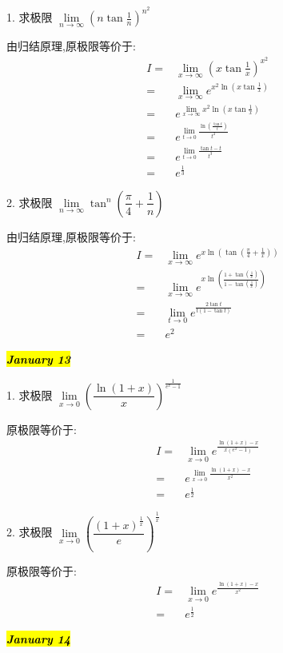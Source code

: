 1. 求极限 $\lim\limits_{n\to \infty}\left(n\tan\frac{1}{n}\right)^{n^{2}}$
\begin{solution}
	
	由归结原理,原极限等价于:
	\begin{align*}
		I = & \lim\limits_{x\to \infty}\left(x\tan\frac{1}{x}\right)^{x^{2}}\\
		  = & \lim\limits_{x\to \infty}e^{x^{2}\ln(x\tan\frac{1}{x})}\\
		  = & e^{\lim\limits_{x\to \infty}x^{2}\ln(x\tan\frac{1}{x})}\\
		  = & e^{\lim\limits_{t\to 0}\frac{\ln(\frac{\tan t}{t})}{t^{2}}}\\
		  = & e^{\lim\limits_{t\to 0}\frac{\tan t-t}{t^{3}}}\\
		  = & e^{\frac{1}{3}}
	\end{align*}
\end{solution}

2. 求极限 $\lim\limits_{n\to \infty}\tan^{n}\left( \dfrac{\pi}{4}+\dfrac{1}{n}\right)$
\begin{solution}
	
	由归结原理,原极限等价于:
	\begin{align*}
		I = & \lim\limits_{x\to \infty}e^{x\ln(\tan(\frac{\pi}{4}+\frac{1}{x}))}\\
		  = & \lim\limits_{x\to \infty}e^{x\ln(\frac{1+\tan(\frac{1}{x})}{1-\tan(\frac{1}{x})})}\\
		  = & \lim\limits_{t\to 0}e^{\frac{2\tan t}{t(1-\tan t)}}\\
		  = & e^{2}
	\end{align*}
\end{solution}
\hl{\textbf{\textit{January 13}}}

1. 求极限 $\lim\limits_{x\to 0}\left( \dfrac{\ln(1+x)}{x}\right)^{\frac{1}{e^{x}-1}}$
\begin{solution}
	
	原极限等价于:
	\begin{align*}
		I = & \lim\limits_{x\to 0}e^{\frac{\ln(1+x)-x}{x(e^{x}-1)}}\\
		  = & e^{\lim\limits_{x\to 0}\frac{\ln(1+x)-x}{x^{2}}}\\
		  = & e^{\frac{1}{2}}
	\end{align*}
\end{solution}

2. 求极限 $\lim\limits_{x\to 0}\left( \dfrac{(1+x)^{\frac{1}{x}}}{e}\right)^{\frac{1}{x}}$
\begin{solution}

	原极限等价于:
	\begin{align*}
		I = & \lim\limits_{x\to 0}e^{\frac{\ln(1+x)-x}{x^{2}}}\\
		  = & e^{\frac{1}{2}}
	\end{align*}
\end{solution}
\hl{\textbf{\textit{January 14}}}

